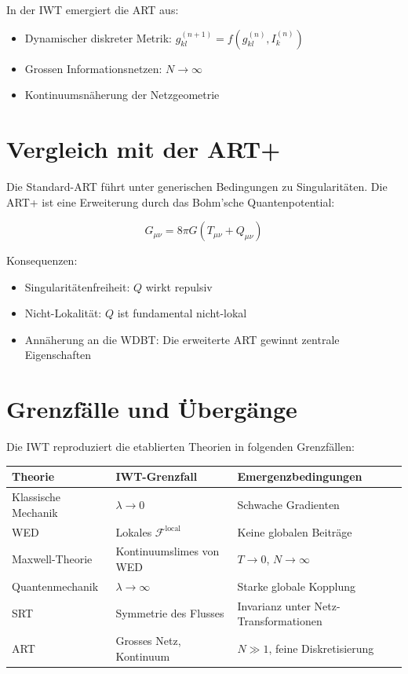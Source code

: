 In der IWT emergiert die ART aus:
\begin{itemize}
\item Dynamischer diskreter Metrik: \( g_{kl}^{(n+1)} = f(g_{kl}^{(n)}, I_k^{(n)}) \)
\item Grossen Informationsnetzen: \( N \to \infty \)
\item Kontinuumsnäherung der Netzgeometrie
\end{itemize}

\section{Vergleich mit der ART+}

Die Standard-ART führt unter generischen Bedingungen zu Singularitäten. Die ART+ ist eine Erweiterung durch das Bohm'sche Quantenpotential:

\[
G_{\mu\nu} = 8\pi G (T_{\mu\nu} + Q_{\mu\nu})
\]

Konsequenzen:
\begin{itemize}
\item Singularitätenfreiheit: \( Q \) wirkt repulsiv
\item Nicht-Lokalität: \( Q \) ist fundamental nicht-lokal
\item Annäherung an die WDBT: Die erweiterte ART gewinnt zentrale Eigenschaften
\end{itemize}

\section{Grenzfälle und Übergänge}

Die IWT reproduziert die etablierten Theorien in folgenden Grenzfällen:

\begin{center}
\begin{tabular}{|l|l|l|}
\hline
\textbf{Theorie} & \textbf{IWT-Grenzfall} & \textbf{Emergenzbedingungen} \\
\hline
Klassische Mechanik & \( \lambda \to 0 \) & Schwache Gradienten \\
WED & Lokales \( \mathcal{F}^{\text{local}} \) & Keine globalen Beiträge \\
Maxwell-Theorie & Kontinuumslimes von WED & \( T \to 0 \), \( N \to \infty \) \\
Quantenmechanik & \( \lambda \to \infty \) & Starke globale Kopplung \\
SRT & Symmetrie des Flusses & Invarianz unter Netz-Transformationen \\
ART & Grosses Netz, Kontinuum & \( N \gg 1 \), feine Diskretisierung \\
\hline
\end{tabular}
\end{center}

